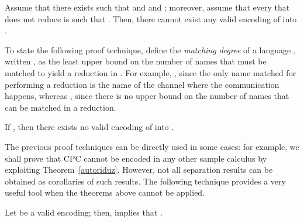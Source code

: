 \documentclass{LMCS}
\begin{document}


\begin{thm}
\label{autoriduz}
Assume that there exists  such that  and
 and ; 
moreover, assume that every 
that does not reduce is such that . Then, 
there cannot exist any 
valid encoding of  into .
\end{thm}

To state the following proof technique, define the {\em matching degree} 
of a language , written , as the least upper bound on the number 
of names that must be matched to yield a reduction in . For example,
, since the only name matched for performing
a reduction is the name of the channel where the communication happens,
whereas , since there is no upper bound
on the number of names that can be matched in a reduction.

\begin{thm}
\label{match}
If , then there exists no 
valid encoding of  into .
\end{thm}

The previous proof techniques can be directly used in some cases: for example,
we shall prove that CPC cannot be encoded in any other sample calculus by exploiting
Theorem~\ref{autoriduz}. However, not all separation results can be obtained as 
corollaries of such results. The following technique provides a very useful tool when
the theorems above cannot be applied.

\begin{prop}
\label{deadlock}
Let  be a valid encoding; then, 
implies that .
\end{prop}
\end{document}
